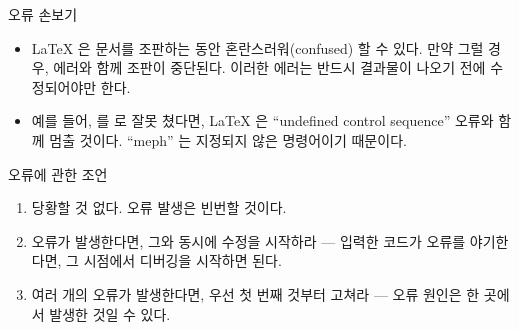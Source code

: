 \documentclass{beamer}
\begin{document}
\begin{frame}[fragile]{오류 손보기}
\begin{itemize}
\item \LaTeX{} 은 문서를 조판하는 동안 혼란스러워(confused) 할 수 있다.
만약 그럴 경우, 에러와 함께 조판이 중단된다. 이러한 에러는 반드시 결과물이 나오기 전에
수정되어야만 한다.
\item 예를 들어,  를  로 잘못 쳤다면, \LaTeX{} 은
``undefined control sequence'' 오류와 함께 멈출 것이다. ``meph'' 는 지정되지 않은
명령어이기 때문이다.
\end{itemize}
\begin{block}{오류에 관한 조언}
\begin{enumerate}
\item 당황할 것 없다. 오류 발생은 빈번할 것이다.
\item 오류가 발생한다면, 그와 동시에 수정을 시작하라 --- 입력한 코드가 오류를
야기한다면, 그 시점에서 디버깅을 시작하면 된다.
\item 여러 개의 오류가 발생한다면, 우선 첫 번째 것부터 고쳐라 --- 오류 원인은
한 곳에서 발생한 것일 수 있다.
\end{enumerate}
\end{block}
\end{frame}
\end{document}
